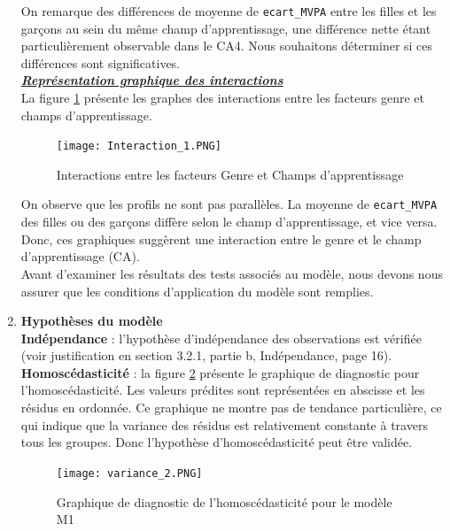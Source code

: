 \documentclass[12pt,a4paper]{article}
\begin{document}
\begin{enumerate}[label=\textbf{\alph*})]
	On remarque des différences de moyenne de \texttt{ecart\_MVPA} entre les filles et les garçons au sein du même champ d'apprentissage, une différence nette étant particulièrement observable dans le CA4. Nous souhaitons déterminer si ces différences sont significatives.\\
	
	\textit{\textbf{\underline{Représentation graphique des interactions}}}\\
	
	La figure \ref{fig:interactions_1} présente les graphes des interactions entre les facteurs genre et champs d'apprentissage.
	\begin{figure}[h!]
		\centering
		\texttt{[image: Interaction\_1.PNG]}
		\caption{Interactions entre les facteurs Genre et Champs d'apprentissage}
		\label{fig:interactions_1}
	\end{figure}
	On observe que les profils ne sont pas parallèles. La moyenne de \texttt{ecart\_MVPA} des filles ou des garçons diffère selon le champ d'apprentissage, et vice versa. Donc, ces graphiques suggèrent une interaction entre le genre et le champ d'apprentissage (CA).\\
	
	Avant d'examiner les résultats des tests associés au modèle, nous devons nous assurer que les conditions d'application du modèle sont remplies.\\


	
\item \textbf{Hypothèses du modèle} \\

\textbf{Indépendance} : l'hypothèse d'indépendance des observations est vérifiée (voir justification en section 3.2.1, partie b, Indépendance, page 16).\\

\textbf{Homoscédasticité} : la figure \ref{fig:variance2} présente le graphique de diagnostic pour l'homoscédasticité. Les valeurs prédites sont représentées en abscisse et les résidus en ordonnée. Ce graphique ne montre pas de tendance particulière, ce qui indique que la variance des résidus est relativement constante à travers tous les groupes. Donc l'hypothèse d'homoscédasticité peut être validée.\\
\begin{figure}[H]
	\centering
	\texttt{[image: variance\_2.PNG]}
	\caption{Graphique de diagnostic de l'homoscédasticité pour le modèle M1}
	\label{fig:variance2}
\end{figure}


\end{enumerate}
\end{document}

